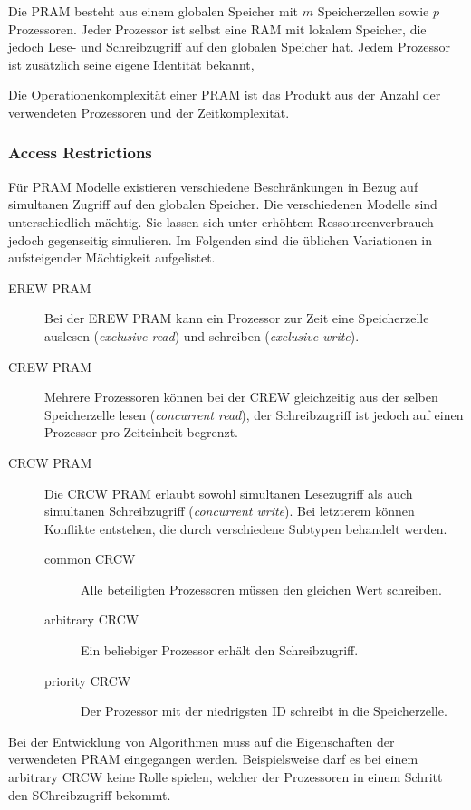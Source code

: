 Die PRAM besteht aus einem globalen Speicher mit $m$ Speicherzellen sowie $p$ Prozessoren.
Jeder Prozessor ist selbst eine RAM mit lokalem Speicher, die jedoch Lese- und Schreibzugriff auf den globalen Speicher hat.
Jedem Prozessor ist zusätzlich seine eigene Identität bekannt,

Die Operationenkomplexität einer PRAM ist das Produkt aus der Anzahl der verwendeten Prozessoren und der Zeitkomplexität.


\subsubsection{Access Restrictions}
Für PRAM Modelle existieren verschiedene Beschränkungen in Bezug auf simultanen Zugriff auf den globalen Speicher.
Die verschiedenen Modelle sind unterschiedlich mächtig. Sie lassen sich unter erhöhtem Ressourcenverbrauch jedoch gegenseitig simulieren.
Im Folgenden sind die üblichen Variationen in aufsteigender Mächtigkeit aufgelistet.
\begin{description}
    \item[EREW PRAM]
        Bei der EREW PRAM kann ein Prozessor zur Zeit eine Speicherzelle auslesen (\emph{exclusive read}) und schreiben (\emph{exclusive write}).
    \item[CREW PRAM]
        Mehrere Prozessoren können bei der CREW gleichzeitig aus der selben Speicherzelle lesen (\emph{concurrent read}), der Schreibzugriff ist jedoch auf einen Prozessor pro Zeiteinheit begrenzt.
    \item[CRCW PRAM]
        Die CRCW PRAM erlaubt sowohl simultanen Lesezugriff als auch simultanen Schreibzugriff (\emph{concurrent write}). Bei letzterem können Konflikte entstehen, die durch verschiedene Subtypen behandelt werden.
        \begin{description}
            \item[common CRCW] Alle beteiligten Prozessoren müssen den gleichen Wert schreiben.
            \item[arbitrary CRCW] Ein beliebiger Prozessor erhält den Schreibzugriff.
            \item[priority CRCW] Der Prozessor mit der niedrigsten ID schreibt in die Speicherzelle.
        \end{description}
\end{description}
Bei der Entwicklung von Algorithmen muss auf die Eigenschaften der verwendeten PRAM eingegangen werden. Beispielsweise darf es bei einem arbitrary CRCW keine Rolle spielen, welcher der Prozessoren in einem Schritt den SChreibzugriff bekommt.
